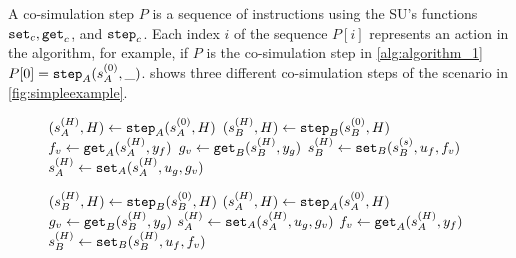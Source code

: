A co-simulation step $P$  is a sequence of instructions using the SU's functions $\mathtt{set}_{c},\mathtt{get}_{c}$, and $\mathtt{step}_{c}$. 
Each index $i$ of the sequence $P[i]$ represents an action in the algorithm, for example, if $P$ is the co-simulation step in \cref{alg:algorithm_1} $P[0] = \mathtt{step}_{A}(s_{A}^{(0)}, \_)$.  shows three different co-simulation steps of the scenario in \cref{fig:simpleexample}. 
\vspace{-1em}
\begin{figure}[htb]
  \centering
  \begin{minipage}[t]{.325\textwidth}
    \begin{algorithm}[H]
      \caption{}
      \label{alg:algorithm_1}
      \begin{algorithmic}[1]
        \scriptsize
        \State $(s_{A}^{(H)},H) \gets \mathtt{step}_{A}(s_{A}^{(0)}, H)$
        \State $(s_{B}^{(H)},H) \gets \mathtt{step}_{B}(s_{B}^{(0)}, H)$
        \State $f_{v} \gets \mathtt{get}_{A}(s_{A}^{(H)}, y_{f})$
        \State $g_{v} \gets \mathtt{get}_{B}(s_{B}^{(H)}, y_{g})$
        \State $s_{B}^{(H)} \gets \mathtt{set}_{B}(s_{B}^{(s)}, u_{f}, f_{v})$
        \State $s_{A}^{(H)} \gets \mathtt{set}_{A}(s_{A}^{(H)},u_{g},g_{v})$
      \end{algorithmic}
    \end{algorithm}
  \end{minipage}
  \begin{minipage}[t]{0.325\textwidth}
    \begin{algorithm}[H]
      \caption{}
      \label{alg:algorithm_2}
      \begin{algorithmic}[1]
        \scriptsize
        \State $(s_{B}^{(H)},H) \gets \mathtt{step}_{B}(s_{B}^{(0)}, H)$
        \State $(s_{A}^{(H)},H) \gets \mathtt{step}_{A}(s_{A}^{(0)}, H)$
        \State $g_v \gets \mathtt{get}_{B}(s_{B}^{(H)}, y_{g})$
        \State $s_{A}^{(H)} \gets \mathtt{set}_{A}(s_{A}^{(H)}, u_{g}, g_v)$
        \State $f_v \gets \mathtt{get}_{A}(s_{A}^{(H)}, y_{f})$
        \State $s_{B}^{(H)} \gets \mathtt{set}_{B}(s_{B}^{(H)}, u_{f}, f_v)$
      \end{algorithmic}
    \end{algorithm}
  \end{minipage}
  \begin{minipage}[t]{0.325\textwidth}
    \begin{algorithm}[H]
      \caption{}
      \label{alg:algorithm_3}

\end{algorithm}
\end{minipage}
\end{figure}
